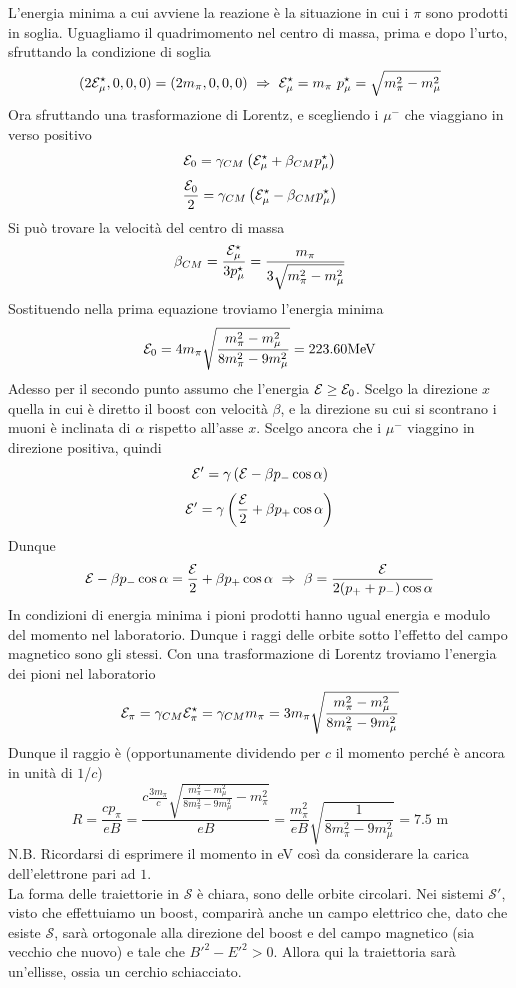 \documentclass[12pt,twoside,a4]{article}
\begin{document}
\begin{solution}
L'energia minima a cui avviene la reazione è la situazione in cui i $\pi$ sono prodotti in soglia. Uguagliamo il quadrimomento nel centro di massa, prima e dopo l'urto, sfruttando la condizione di soglia
$$ (2 \mathcal{E}^\star_\mu,0,0,0) = (2 m_\pi,0,0,0 )  \  \Rightarrow  \  \mathcal{E}^\star_\mu = m_\pi  \  p_\mu^\star = \sqrt{m^2_\pi - m^2_\mu} $$
Ora sfruttando una trasformazione di Lorentz, e scegliendo i $\mu^-$ che viaggiano in verso positivo
$$ \mathcal{E}_0 = \gamma_{CM} \left({\mathcal{E}^\star_\mu +\beta_{CM} p^\star_\mu}\right) $$
$$ \frac{\mathcal{E}_0}{2} = \gamma_{CM} \left({\mathcal{E}^\star_\mu - \beta_{CM} p^\star_\mu}\right) $$
Si può trovare la velocità  del centro di massa
$$\beta_{CM} =  \frac{\mathcal{E}^\star_\mu}{3 p^\star_\mu} =  \frac{m_\pi}{3 \sqrt{m^2_\pi - m^2_\mu}}$$
Sostituendo nella prima equazione troviamo l'energia minima
$$\mathcal{E}_0 = 4 m_\pi \sqrt{\frac{m^2_\pi - m^2_\mu}{8 m^2_\pi - 9m^2_\mu}}= 223.60 \mathrm{MeV}$$
Adesso per il secondo punto assumo che l'energia $\mathcal{E} \geq \mathcal{E}_0$. Scelgo la direzione $x$ quella in cui è diretto il boost con velocità  $\beta$, e la direzione su cui si scontrano i muoni è inclinata di $\alpha$ rispetto all'asse $x$. Scelgo ancora che i $\mu^-$ viaggino in direzione positiva, quindi
$$ \mathcal{E}' = \gamma \left({\mathcal{E} - \beta p_- \cos \alpha}\right) $$
$$ \mathcal{E}' = \gamma \left({\frac{\mathcal{E}}{2} + \beta p_+ \cos \alpha}\right) $$
Dunque
$$ \mathcal{E} - \beta p_- \cos \alpha = \frac{\mathcal{E}}{2} + \beta p_+ \cos \alpha  \  \Rightarrow  \  \beta = \frac{\mathcal{E}}{2 (p_+ + p_- ) \cos \alpha} $$
In condizioni di energia minima i pioni prodotti hanno ugual energia e modulo del momento nel laboratorio. Dunque i raggi delle orbite sotto l'effetto del campo magnetico sono gli stessi. Con una trasformazione di Lorentz troviamo l'energia dei pioni nel laboratorio
$$ \mathcal{E}_\pi = \gamma_{CM} \mathcal{E}^\star_\pi = \gamma_{CM} m_\pi = 3 m_\pi \sqrt{\frac{m_\pi^2 - m_\mu^2}{8 m_\pi^2 - 9 m_\mu^2}}$$
Dunque il raggio è (opportunamente dividendo per $c$ il momento perché è ancora in unità  di $1$/$c$) 
$$ R = \frac{c p_\pi}{e B} = \frac{c \frac{3 m_\pi}{c} \sqrt{\frac{m_\pi^2 - m_\mu^2}{8 m_\pi^2 - 9 m_\mu^2} - m_\pi^2}}{e B} = \frac{m_\pi^2}{eB} \sqrt{\frac{1}{8m^2_\pi -9 m^2_\mu} } = 7.5 \mbox{ m}$$
N.B. Ricordarsi di esprimere il momento in eV così da considerare la carica dell'elettrone pari ad $1$.
\\
La forma delle traiettorie in $\mathcal{S}$ è chiara, sono delle orbite circolari. Nei sistemi $\mathcal{S}'$, visto che effettuiamo un boost, comparirà  anche un campo elettrico che, dato che esiste $\mathcal{S}$, sarà  ortogonale alla direzione del boost e del campo magnetico (sia vecchio che nuovo) e tale che $B'^2 - E'^2 > 0$. Allora qui la traiettoria sarà  un'ellisse, ossia un cerchio schiacciato.
\end{solution}
\end{document}
